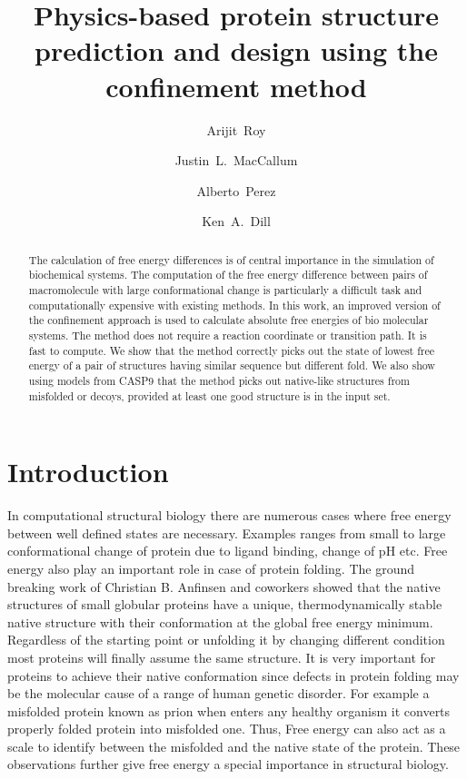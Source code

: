 \documentclass[12pt]{article}
\author{Arijit~Roy}
\author{Justin~L.~MacCallum}
\author{Alberto~Perez}
\author{Ken~A.~Dill}
\affil{Laufer Center for Physical and Quantitative Biology\\
    Stony Brook University\\
    Stony Brook, NY 11794-5252.}
\title{Physics-based protein structure prediction and design using the confinement method}
\begin{document}
\maketitle

\begin{abstract}

The calculation of free energy differences is of central importance in the simulation of biochemical
systems.  The computation of the free energy difference between pairs of macromolecule with large
conformational change is particularly a difficult task and computationally expensive with existing
methods. In this work, an improved version of the confinement approach is used to calculate absolute
free energies of bio molecular systems. The method does not require a reaction coordinate or
transition path. It is fast to compute. We show that the method correctly picks out the state of
lowest free energy of a pair of structures having similar sequence but different fold. We also show
using models from CASP9 that the method picks out native-like structures from misfolded or decoys,
provided at least one good structure is in the input set.

\end{abstract}


\section{Introduction}

In computational structural biology there are numerous cases where free energy between well defined
states are necessary. Examples ranges from small to large conformational change of protein due to
ligand binding, change of pH etc. Free energy also play an important role in case of protein
folding. The ground breaking work of Christian B. Anfinsen and coworkers showed that the native
structures of small globular proteins have a unique, thermodynamically stable native structure with
their conformation at the global free energy minimum. Regardless of the starting point or unfolding
it by changing different condition most proteins will finally assume the same structure. It is very
important for proteins to achieve their native conformation since defects in protein folding may be
the molecular cause of a range of human genetic disorder. For example a misfolded protein known as
prion when enters any healthy organism it converts properly folded protein into misfolded one.
Thus, Free energy can also act as a scale to identify between the misfolded and the native state of
the protein. These observations further give free energy a special importance in structural biology.
\end{document}
